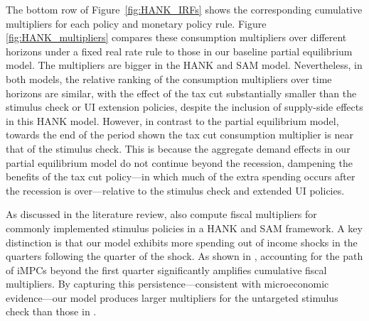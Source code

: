 The bottom row of Figure~\ref{fig:HANK_IRFs} shows the corresponding cumulative multipliers for each policy and monetary policy rule. Figure \ref{fig:HANK_multipliers} compares these consumption multipliers over different horizons under a fixed real rate rule to those in our baseline partial equilibrium model.
The multipliers are bigger in the HANK and SAM model.
Nevertheless, in both models, the relative ranking of the consumption multipliers over time horizons are similar, with the effect of the tax cut substantially smaller than the stimulus check or UI extension policies, despite the inclusion of supply-side effects in this HANK model.
However, in contrast to the partial equilibrium model, towards the end of the period shown the tax cut consumption multiplier is near that of the stimulus check.
This is because the aggregate demand effects in our partial equilibrium model do not continue beyond the recession, dampening the benefits of the tax cut policy---in which much of the extra spending occurs after the recession is over---relative to the stimulus check and extended UI policies.

As discussed in the literature review, \cite{broer2025stimulus} also compute fiscal multipliers for commonly implemented stimulus policies in a HANK and SAM framework. A key distinction is that our model exhibits more spending out of income shocks in the quarters following the quarter of the shock. As shown in \cite{auclert2018IKC}, accounting for the path of iMPCs beyond the first quarter significantly amplifies cumulative fiscal multipliers. By capturing this persistence—consistent with microeconomic evidence—our model produces larger multipliers for the untargeted stimulus check than those in \cite{broer2025stimulus}.


